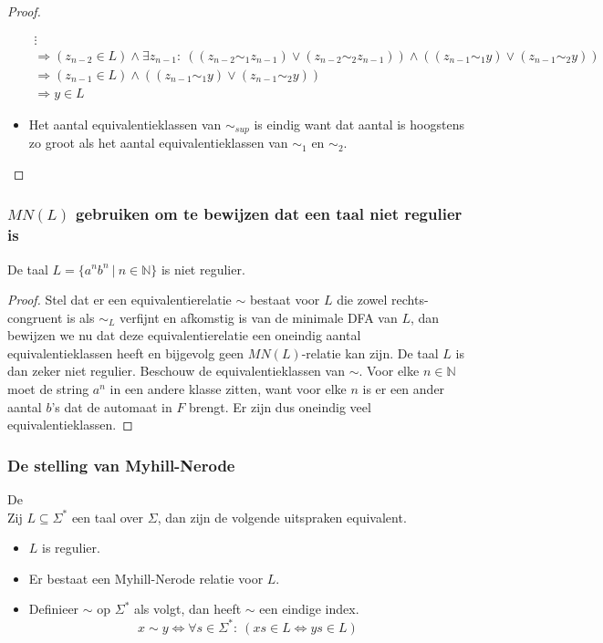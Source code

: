 \documentclass[main.tex]{subfiles}
\begin{document}
\begin{st}
\begin{proof}
\begin{itemize}
\[\begin{array}{l}
        \vdots\\
        \Rightarrow (z_{n-2} \in L) \wedge \exists z_{n-1}:\ ((z_{n-2} \sim_{1} z_{n-1}) \vee (z_{n-2} \sim_{2} z_{n-1})) \wedge ((z_{n-1} \sim_{1} y) \vee (z_{n-1} \sim_{2} y))\\
        \Rightarrow (z_{n-1} \in L) \wedge ((z_{n-1} \sim_{1} y) \vee (z_{n-1} \sim_{2} y))\\
        \Rightarrow y \in L
      \end{array}
      \]
    \item Het aantal equivalentieklassen van $\sim_{sup}$ is eindig want dat aantal is hoogstens zo groot als het aantal equivalentieklassen van $\sim_{1}$ en $\sim_{2}$.
    \end{itemize}
  \end{proof}
\end{st}

\subsubsection{$MN(L)$ gebruiken om te bewijzen dat een taal niet regulier is}
\label{sec:mnl-gebruiken-om}

\begin{st}
  De taal $L= \{ a^{n}b^{n} \ |\ n\in \mathbb{N} \} $ is niet regulier.

  \begin{proof}
    Stel dat er een equivalentierelatie $\sim$ bestaat voor $L$ die zowel rechts-congruent is als $\sim_{L}$ verfijnt en afkomstig is van de minimale DFA van $L$, dan bewijzen we nu dat deze equivalentierelatie een oneindig aantal equivalentieklassen heeft en bijgevolg geen $MN(L)$-relatie kan zijn.
    De taal $L$ is dan zeker niet regulier.
    Beschouw de equivalentieklassen van $\sim$.
    Voor elke $n\in \mathbb{N}$ moet de string $a^{n}$ in een andere klasse zitten, want voor elke $n$ is er een ander aantal $b$'s dat de automaat in $F$ brengt.
    Er zijn dus oneindig veel equivalentieklassen.
  \end{proof}
\end{st}

\subsubsection{De stelling van Myhill-Nerode}
\label{sec:de-stelling-van}

\begin{st}
  De \\
  Zij $L\subseteq \Sigma^{*}$ een taal over $\Sigma$, dan zijn de volgende uitspraken equivalent.
  \begin{itemize}
  \item $L$ is regulier.
  \item Er bestaat een Myhill-Nerode relatie voor $L$.
  \item Definieer $\sim$ op $\Sigma^{*}$ als volgt, dan heeft $\sim$ een eindige index.
    \[ x \sim y \Leftrightarrow \forall s \in \Sigma^{*}:\ (xs \in L \Leftrightarrow ys \in L) \]
  \end{itemize}
  \zb
\end{st}
\end{document}
